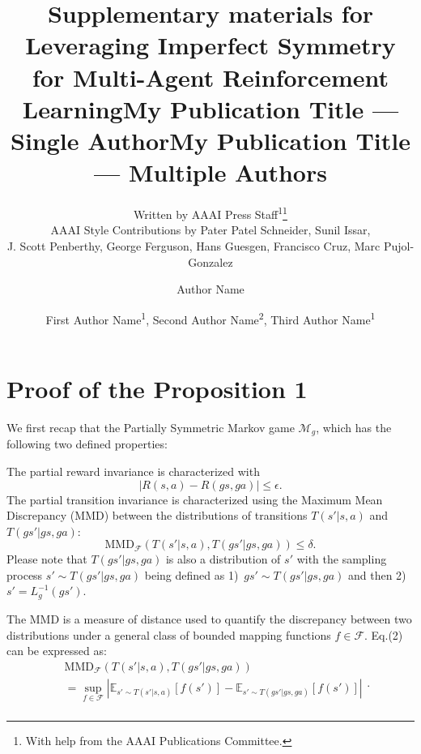 \documentclass[letterpaper]{article} %
\title{Supplementary materials for Leveraging Imperfect Symmetry for Multi-Agent Reinforcement Learning}
\author{
    Written by AAAI Press Staff\textsuperscript{\rm 1}\thanks{With help from the AAAI Publications Committee.}\\
    AAAI Style Contributions by Pater Patel Schneider,
    Sunil Issar,\\
    J. Scott Penberthy,
    George Ferguson,
    Hans Guesgen,
    Francisco Cruz\equalcontrib,
    Marc Pujol-Gonzalez\equalcontrib
}
\title{My Publication Title --- Single Author}
\author {
    Author Name
}
\title{My Publication Title --- Multiple Authors}
\author {
    First Author Name\textsuperscript{\rm 1},
    Second Author Name\textsuperscript{\rm 2},
    Third Author Name\textsuperscript{\rm 1}
}
\theoremstyle{definition}
\newtheorem{definition}{Definition}
\begin{document}
\maketitle


\section{Proof of the Proposition 1}

We first recap that the Partially Symmetric Markov game $\mathcal{M}_g$, which has the following two defined properties:

The partial reward invariance is characterized with
\begin{equation}
    |R(s, a) - R(gs, ga)| \leq \epsilon \label{rewardequ}.
\end{equation}
The partial transition invariance is characterized using the Maximum Mean Discrepancy (MMD) between the distributions of transitions $T(s'|s, a)$ and $T(gs'|gs, ga)$: 
\begin{equation}
    \text{MMD}_{\mathcal{F}}\left(T(s'|s, a), T(gs'|gs, ga)\right)\leq \delta \label{transequ}.
\end{equation}
Please note that $T(gs'|gs, ga)$ is also a distribution of $s'$ with the sampling process $s' \sim T(gs'|gs, ga)$ being defined as 1)~$gs' \sim T(gs'|gs, ga)$ and then 2) $s'=L_g^{-1}(gs')$.

The MMD is a measure of distance used to quantify the discrepancy between two distributions under a general class of  bounded mapping functions $f \in \mathcal{F}$. Eq.(2) can be expressed as:
\begin{equation*}
\begin{aligned}
    &\text{MMD}_{\mathcal{F}}\left(T(s'|s, a), T(gs'|gs, ga)\right) \\
    &= \sup_{f \in \mathcal{F}} \left| \mathbb{E}_{s' \sim T(s'|s, a)}[f(s')] - \mathbb{E}_{s' \sim T(gs'|gs, ga)}[f(s')] \right| \\   
\end{aligned}.
\end{equation*}
\end{document}
